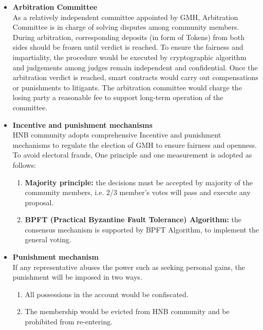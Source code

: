 \documentclass[fleqn,10pt]{SelfArx} %
\begin{document}
\begin{itemize}
\item{\textbf {Arbitration Committee}\\
As a relatively independent committee appointed by GMH, Arbitration Committee is in charge of solving disputes among community members. During arbitration, corresponding deposits (in form of Tokens) from both sides should be frozen until verdict is reached. To ensure the fairness and impartiality, the procedure would be executed by cryptographic algorithm and judgements among judges remain independent and confidential. Once the arbitration verdict is reached, smart contracts would carry out compensations or punishments to litigants. The arbitration committee would charge the losing party a reasonable fee to support long-term operation of the committee.}\\

\item{\textbf {Incentive and punishment mechanisms}\\
HNB community adopts comprehensive Incentive and punishment mechanisms to regulate the election of GMH to ensure fairness and openness. To avoid electoral frauds, One principle and one measurement is adopted as follows:
\begin{enumerate}[noitemsep] %
\item \textbf{Majority principle:} the decisions must be accepted by majority of the community members, i.e. 2/3 member’s votes will pass and execute any proposal. 
\item \textbf{BPFT (Practical Byzantine Fault Tolerance) Algorithm:} the consensus mechanism is supported by BPFT Algorithm, to implement the general voting. 
\end{enumerate}
}

\item{\textbf {Punishment mechanism}\\
If any representative abuses the power such as seeking personal gains, the punishment will be imposed in two ways.
\begin{enumerate}[noitemsep] %
\item All possessions in the account would be confiscated. 
\item The membership would be evicted from HNB community and be prohibited from re-entering.
\end{enumerate}
}
\end{itemize}
\end{document}
